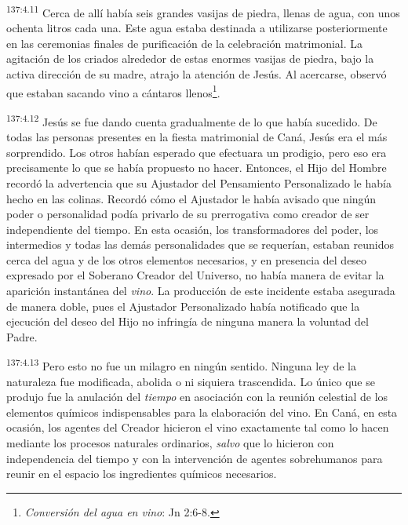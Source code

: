\par 
\textsuperscript{137:4.11} Cerca de allí había seis grandes vasijas de piedra, llenas de agua, con unos ochenta litros cada una. Este agua estaba destinada a utilizarse posteriormente en las ceremonias finales de purificación de la celebración matrimonial. La agitación de los criados alrededor de estas enormes vasijas de piedra, bajo la activa dirección de su madre, atrajo la atención de Jesús. Al acercarse, observó que estaban sacando vino a cántaros llenos\footnote{\textit{Conversión del agua en vino}: Jn 2:6-8.}.

\par 
\textsuperscript{137:4.12} Jesús se fue dando cuenta gradualmente de lo que había sucedido. De todas las personas presentes en la fiesta matrimonial de Caná, Jesús era el más sorprendido. Los otros habían esperado que efectuara un prodigio, pero eso era precisamente lo que se había propuesto no hacer. Entonces, el Hijo del Hombre recordó la advertencia que su Ajustador del Pensamiento Personalizado le había hecho en las colinas. Recordó cómo el Ajustador le había avisado que ningún poder o personalidad podía privarlo de su prerrogativa como creador de ser independiente del tiempo. En esta ocasión, los transformadores del poder, los intermedios y todas las demás personalidades que se requerían, estaban reunidos cerca del agua y de los otros elementos necesarios, y en presencia del deseo expresado por el Soberano Creador del Universo, no había manera de evitar la aparición instantánea del \textit{vino}. La producción de este incidente estaba asegurada de manera doble, pues el Ajustador Personalizado había notificado que la ejecución del deseo del Hijo no infringía de ninguna manera la voluntad del Padre.

\par 
\textsuperscript{137:4.13} Pero esto no fue un milagro en ningún sentido. Ninguna ley de la naturaleza fue modificada, abolida o ni siquiera trascendida. Lo único que se produjo fue la anulación del \textit{tiempo} en asociación con la reunión celestial de los elementos químicos indispensables para la elaboración del vino. En Caná, en esta ocasión, los agentes del Creador hicieron el vino exactamente tal como lo hacen mediante los procesos naturales ordinarios, \textit{salvo} que lo hicieron con independencia del tiempo y con la intervención de agentes sobrehumanos para reunir en el espacio los ingredientes químicos necesarios.

